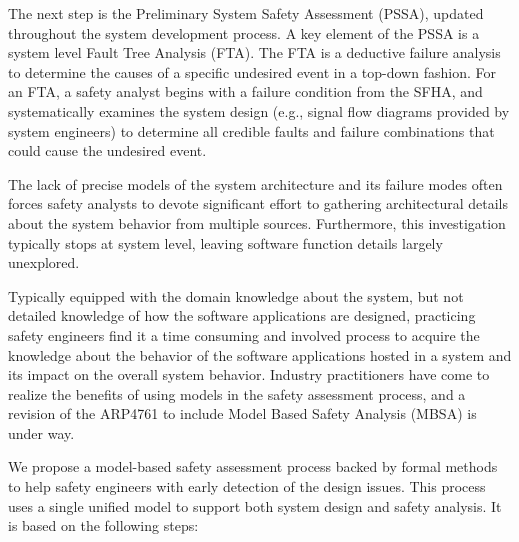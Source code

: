 The next step is the Preliminary System Safety Assessment (PSSA), updated throughout the system development process. A key element of the PSSA is a system level Fault Tree Analysis (FTA).  The FTA is a deductive failure analysis to determine the causes of a specific undesired event in a top-down fashion. For an FTA, a safety analyst begins with a failure condition from the SFHA, and systematically examines the system design (e.g., signal flow diagrams provided by system engineers) to determine all credible faults and failure combinations that could cause the undesired event. 

The lack of precise models of the system architecture and its failure modes often forces safety analysts to devote significant effort to gathering architectural details about the system behavior from multiple sources. Furthermore, this investigation typically stops at system level, leaving software function details largely unexplored.

Typically equipped with the domain knowledge about the system, but not detailed knowledge of how the software applications are designed, practicing safety engineers find it a time consuming and involved process to acquire the knowledge about the behavior of the software applications hosted in a system and its impact on the overall system behavior.
Industry practitioners have come to realize the benefits of using models in the safety assessment process, and a revision of the ARP4761 to include Model Based Safety Analysis (MBSA) is under way.

We propose a model-based safety assessment process backed by formal methods to help safety engineers with early detection of the design issues.  This process uses a single unified model to support both system design and safety analysis. It is based on the following steps:

